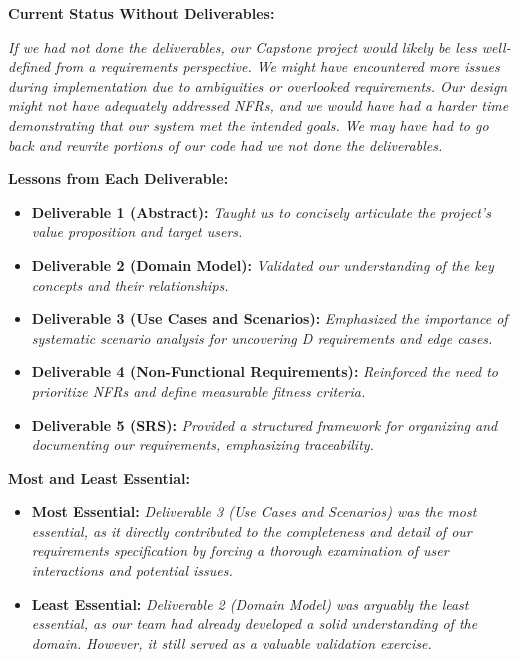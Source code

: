 \documentclass{article}
\begin{document}
\textbf{Current Status Without Deliverables:}

\textit{If we had not done the deliverables, our Capstone project would likely be less well-defined from a requirements perspective. We might have encountered more issues during implementation due to ambiguities or overlooked requirements. Our design might not have adequately addressed NFRs, and we would have had a harder time demonstrating that our system met the intended goals. We may have had to go back and rewrite portions of our code had we not done the deliverables.}

\textbf{Lessons from Each Deliverable:}

\begin{itemize}
    \item \textbf{Deliverable 1 (Abstract):} \textit{Taught us to concisely articulate the project's value proposition and target users.}
    \item \textbf{Deliverable 2 (Domain Model):} \textit{Validated our understanding of the key concepts and their relationships.}
    \item \textbf{Deliverable 3 (Use Cases and Scenarios):} \textit{Emphasized the importance of systematic scenario analysis for uncovering D requirements and edge cases.}
    \item \textbf{Deliverable 4 (Non-Functional Requirements):} \textit{Reinforced the need to prioritize NFRs and define measurable fitness criteria.}
    \item \textbf{Deliverable 5 (SRS):} \textit{Provided a structured framework for organizing and documenting our requirements, emphasizing traceability.}
\end{itemize}

\textbf{Most and Least Essential:}

\begin{itemize}
    \item \textbf{Most Essential:} \textit{Deliverable 3 (Use Cases and Scenarios) was the most essential, as it directly contributed to the completeness and detail of our requirements specification by forcing a thorough examination of user interactions and potential issues.}
    \item \textbf{Least Essential:} \textit{Deliverable 2 (Domain Model) was arguably the least essential, as our team had already developed a solid understanding of the domain. However, it still served as a valuable validation exercise.}
\end{itemize}
\end{document}
